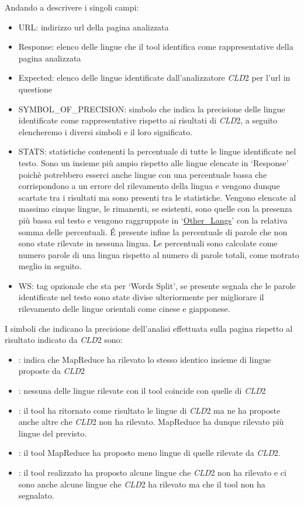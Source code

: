 \documentclass{article}
\newcommand{\MR}{MapReduce}
\newcommand{\cld}{\textit{CLD}2}
\newcommand{\mintedstyle}[1]{\url{#1}}
\begin{document}
Andando a descrivere i singoli campi:
\begin{itemize}
    \item URL: indirizzo url della pagina analizzata
    \item Response: elenco delle lingue che il tool identifica come rappresentative della pagina analizzata
    \item Expected: elenco delle lingue identificate dall'analizzatore \cld{} per l'url in questione
    \item SYMBOL\_OF\_PRECISION: simbolo che indica la precisione delle lingue identificate come rappresentative rispetto ai risultati di \cld{}, a seguito elencheremo i diversi simboli e il loro significato.
    \item STATS: statistiche contenenti la percentuale di tutte le lingue identificate nel testo. Sono un insieme più ampio rispetto alle lingue elencate in `Response' poichè potrebbero esserci anche lingue con una percentuale bassa che corrispondono a un errore del rilevamento della lingua e vengono dunque scartate tra i risultati ma sono presenti tra le statistiche. Vengono elencate al massimo cinque lingue, le rimanenti, se esistenti, sono quelle con la presenza più bassa sul testo e vengono raggruppate in `\mintedstyle{Other\_Langs}' con la relativa somma delle percentuali. \'E presente infine la percentuale di parole che non sono state rilevate in nessuna lingua. Le percentuali sono calcolate come numero parole di una lingua rispetto al numero di parole totali, come motrato meglio in seguito.
    \item WS: tag opzionale che sta per `Words Split', se presente segnala che le parole identificate nel testo sono state divise ulteriormente per migliorare il rilevamento delle lingue orientali come cinese e giapponese.
\end{itemize}

I simboli che indicano la precisione dell'analisi effettuata sulla pagina rispetto al risultato indicato da \cld{} sono:
\begin{itemize}
    \item \imgtick{} : indica che \MR{} ha rilevato lo stesso identico insieme di lingue proposte da \cld{}
    \item \imgx{} : nessuna delle lingue rilevate con il tool coincide con quelle di \cld{}
    \item \imgplus{} : il tool ha ritornato come risultato le lingue di \cld{} ma ne ha proposte anche altre che \cld{} non ha rilevato. \MR{} ha dunque rilevato più lingue del previsto. 
    \item \imgminus{} : il tool \MR{} ha proposto meno lingue di quelle rilevate da \cld{}.
    \item \imgdivided{} : il tool realizzato ha proposto alcune lingue che \cld{} non ha rilevato e ci sono anche alcune lingue che \cld{} ha rilevato ma che il tool non ha segnalato.
\end{itemize}
\end{document}
